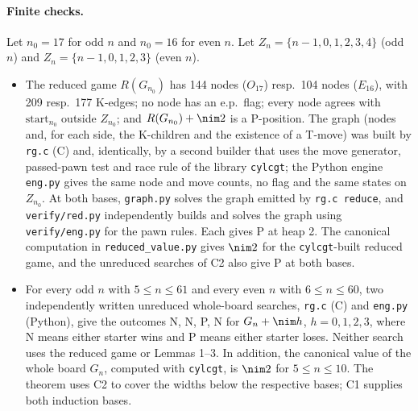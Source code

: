 \paragraph{Finite checks.} Let $n_0=17$ for odd $n$ and $n_0=16$ for even $n$. Let $Z_n=\{n-1,0,1,2,3,4\}$ (odd $n$) and
$Z_n=\{n-1,0,1,2,3\}$ (even $n$).
\begin{itemize}
\item[\textbf{C1}]  The reduced game $R(G_{n_0})$ has 144 nodes ($O_{17}$) resp.\ 104 nodes ($E_{16}$), with 209 resp.\ 177
K-edges; no node has an e.p.\ flag; every node agrees with $\mathrm{start}_{n_0}$ outside $Z_{n_0}$; and $R(G_{n_0})+\nim2$ is a
P-position. The graph (nodes and, for each side, the K-children and the existence of a T-move) was built by \texttt{rg.c} (C) and,
identically, by a second builder that uses the move generator, passed-pawn test and race rule of the library \texttt{cylcgt}; the
Python engine \texttt{eng.py} gives the same node and move counts, no flag and the same states on $Z_{n_0}$. At both bases, \texttt{graph.py} solves the graph emitted by \texttt{rg.c reduce}, and \texttt{verify/red.py} independently builds and solves the graph using \texttt{verify/eng.py} for the pawn rules. Each gives P at heap 2. The canonical computation in \texttt{reduced\_value.py} gives $\nim2$ for the \texttt{cylcgt}-built reduced game, and the unreduced searches of C2 also give P at both bases.
\item[\textbf{C2}]  For every odd $n$ with $5\le n\le61$ and every even $n$ with $6\le n\le60$, two independently written
unreduced whole-board searches, \texttt{rg.c} (C) and \texttt{eng.py} (Python), give the outcomes N, N, P, N for $G_n+\nim h$,
$h=0,1,2,3$, where N means either starter wins and P means either starter loses. Neither search uses the reduced game or Lemmas 1--3. In addition, the canonical value of the whole
board $G_n$, computed with \texttt{cylcgt}, is $\nim2$ for $5\le n\le10$. The theorem uses C2 to cover the widths below the respective bases; C1 supplies both induction bases.
\end{itemize}

